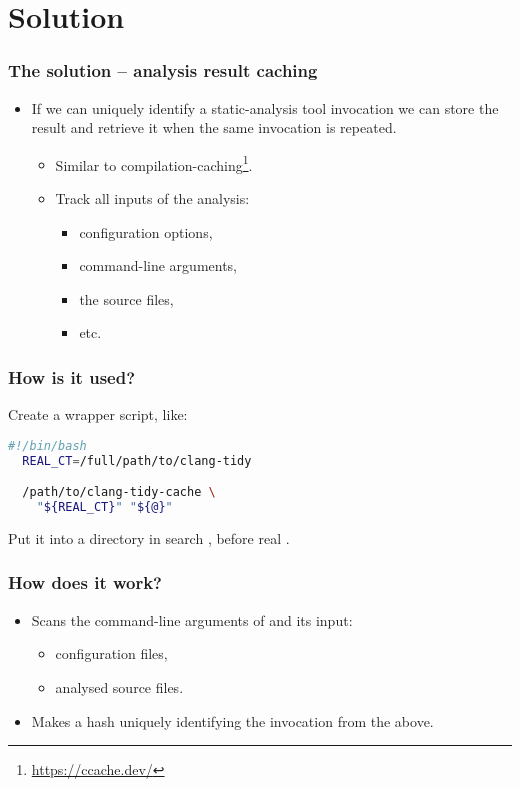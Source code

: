\documentclass[compress,table,xcolor=table]{beamer}
\begin{document}
\section{Solution}
\begin{frame}
  \frametitle{The solution -- analysis result caching}
    \Large
    \begin{itemize}
    \item If we can uniquely identify a static-analysis tool invocation
        we can store the result and retrieve it when the same invocation
        is repeated.
        \begin{itemize}
        \item Similar to compilation-caching\footnote{
            \url{https://ccache.dev/}}.
        \item Track all inputs of the analysis:
            \begin{itemize}
            \large
            \item configuration options,
            \item command-line arguments,
            \item the source files,
            \item etc.
            \end{itemize}
        \end{itemize}
    \end{itemize}
\end{frame}
\begin{frame}[fragile]
  \frametitle{How is it used?}
  \LARGE
  Create a wrapper script, like:
  \begin{lstlisting}[language=bash]
  #!/bin/bash
  REAL_CT=/full/path/to/clang-tidy

  /path/to/clang-tidy-cache \
    "${REAL_CT}" "${@}"
  \end{lstlisting}
  Put it into a directory in search , before real
  \cmdname{clang-tidy}.
\end{frame}
\begin{frame}
  \frametitle{How does it work?}
    \LARGE
    \begin{itemize}
        \item Scans the command-line arguments of  and
            its input:
        \begin{itemize}
            \Large
            \item configuration files,
            \item analysed source files.
        \end{itemize}
        \item Makes a hash uniquely identifying the invocation from
            the above.
    \end{itemize}
\end{frame}
\end{document}
